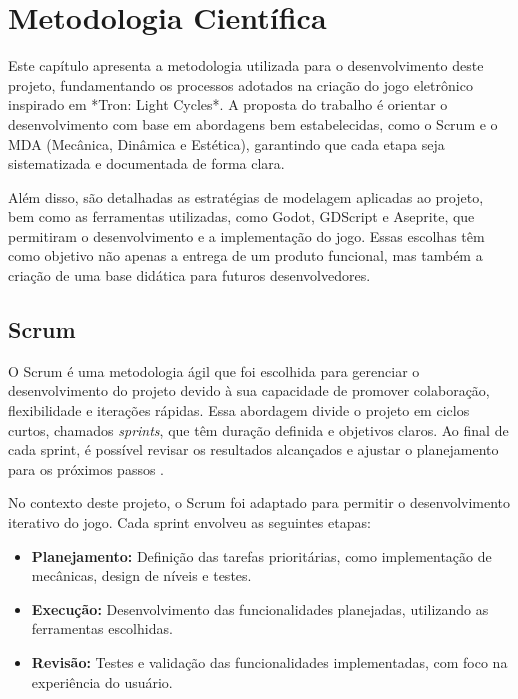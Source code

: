 \chapter[Metodologia Científica]{Metodologia Científica}
\label{sec:metodologia}

Este capítulo apresenta a metodologia utilizada para o desenvolvimento deste projeto, fundamentando os processos adotados na criação do jogo eletrônico inspirado em *Tron: Light Cycles*. A proposta do trabalho é orientar o desenvolvimento com base em abordagens bem estabelecidas, como o Scrum e o MDA (Mecânica, Dinâmica e Estética), garantindo que cada etapa seja sistematizada e documentada de forma clara.

Além disso, são detalhadas as estratégias de modelagem aplicadas ao projeto, bem como as ferramentas utilizadas, como Godot, GDScript e Aseprite, que permitiram o desenvolvimento e a implementação do jogo. Essas escolhas têm como objetivo não apenas a entrega de um produto funcional, mas também a criação de uma base didática para futuros desenvolvedores.

\section{Scrum}

O Scrum é uma metodologia ágil que foi escolhida para gerenciar o desenvolvimento do projeto devido à sua capacidade de promover colaboração, flexibilidade e iterações rápidas. Essa abordagem divide o projeto em ciclos curtos, chamados \textit{sprints}, que têm duração definida e objetivos claros. Ao final de cada sprint, é possível revisar os resultados alcançados e ajustar o planejamento para os próximos passos \cite{schwaber2013}.

No contexto deste projeto, o Scrum foi adaptado para permitir o desenvolvimento iterativo do jogo. Cada sprint envolveu as seguintes etapas:

\begin{itemize}
  \item \textbf{Planejamento:} Definição das tarefas prioritárias, como implementação de mecânicas, design de níveis e testes.
  \item \textbf{Execução:} Desenvolvimento das funcionalidades planejadas, utilizando as ferramentas escolhidas.
  \item \textbf{Revisão:} Testes e validação das funcionalidades implementadas, com foco na experiência do usuário.
\end{itemize}

